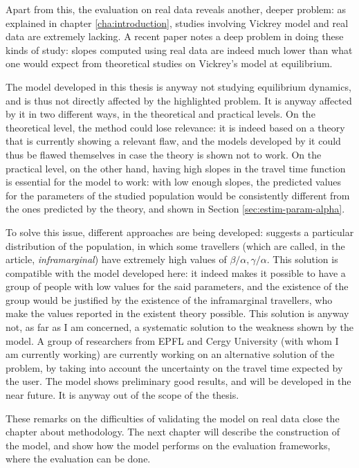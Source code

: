 Apart from this, the evaluation on real data reveals another, deeper problem:
as explained in chapter \ref{cha:introduction},
studies involving Vickrey model and real data are extremely lacking.
A recent paper \parencite{https://doi.org/10.1111/iere.12692} notes a deep problem in doing these kinds of study:
slopes computed using real data are indeed much lower than what one would expect from theoretical studies on Vickrey's model at equilibrium.

The model developed in this thesis is anyway not studying equilibrium dynamics,
and is thus not directly affected by the highlighted problem.
It is anyway affected by it in two different ways, in the theoretical and practical levels.
On the theoretical level, the method could lose relevance:
it is indeed based on a theory that is currently showing a relevant flaw,
and the models developed by it could thus be flawed themselves in case the theory is shown not to work.
On the practical level, on the other hand,
having high slopes in the travel time function is essential for the model to work:
with low enough slopes,
the predicted values for the parameters of the studied population would be consistently different from the ones predicted by the theory, and shown in Section \ref{sec:estim-param-alpha}.

To solve this issue, different approaches are being developed:
\textcite{https://doi.org/10.1111/iere.12692} suggests a particular distribution of the population,
in which some travellers (which are called, in the article, \textit{inframarginal}) have extremely high values of \(\beta/\alpha, \gamma/\alpha\).
This solution is compatible with the model developed here:
it indeed makes it possible to have a group of people with low values for the said parameters,
and the existence of the group would be justified by the existence of the inframarginal travellers,
who make the values reported in the existent theory possible.
This solution is anyway not, as far as I am concerned,
a systematic solution to the weakness shown by the model.
A group of researchers from EPFL and Cergy University (with whom I am currently working) are currently working on an alternative solution of the problem,
by taking into account the uncertainty on the travel time expected by the user.
The model shows preliminary good results, and will be developed in the near future.
It is anyway out of the scope of the thesis.

These remarks on the difficulties of validating the model on real data close the chapter about methodology.
The next chapter will describe the construction of the model,
and show how the model performs on the evaluation frameworks,
where the evaluation can be done.


